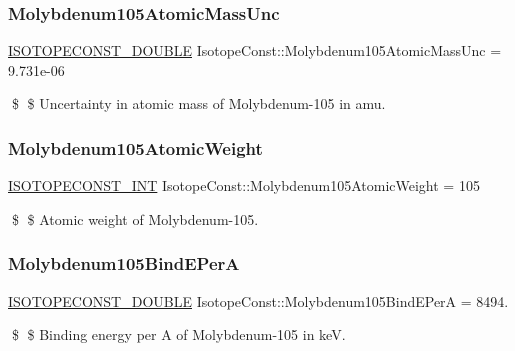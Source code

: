\subsubsection{\texorpdfstring{Molybdenum105\+Atomic\+Mass\+Unc}{Molybdenum105AtomicMassUnc}}
{\footnotesize\ttfamily \mbox{\hyperlink{group___isotope_const-_macros_ga8f45a7272ce02c0b4c65c44636ed719a}{I\+S\+O\+T\+O\+P\+E\+C\+O\+N\+S\+T\+\_\+\+D\+O\+U\+B\+LE}} Isotope\+Const\+::\+Molybdenum105\+Atomic\+Mass\+Unc = 9.\+731e-\/06}

\$ \$ Uncertainty in atomic mass of Molybdenum-\/105 in amu. \mbox{\label{group___isotope_const-_molybdenum-_mo105_gab3e9d7db3d391be26681299f3b67ff0d}} 
\subsubsection{\texorpdfstring{Molybdenum105\+Atomic\+Weight}{Molybdenum105AtomicWeight}}
{\footnotesize\ttfamily \mbox{\hyperlink{group___isotope_const-_macros_ga5f18360b3e99483a35c32d789e62621c}{I\+S\+O\+T\+O\+P\+E\+C\+O\+N\+S\+T\+\_\+\+I\+NT}} Isotope\+Const\+::\+Molybdenum105\+Atomic\+Weight = 105}

\$ \$ Atomic weight of Molybdenum-\/105. \mbox{\label{group___isotope_const-_molybdenum-_mo105_gaf67e3b90991cdcbb587a39f0efc6b17d}} 
\subsubsection{\texorpdfstring{Molybdenum105\+Bind\+E\+PerA}{Molybdenum105BindEPerA}}
{\footnotesize\ttfamily \mbox{\hyperlink{group___isotope_const-_macros_ga8f45a7272ce02c0b4c65c44636ed719a}{I\+S\+O\+T\+O\+P\+E\+C\+O\+N\+S\+T\+\_\+\+D\+O\+U\+B\+LE}} Isotope\+Const\+::\+Molybdenum105\+Bind\+E\+PerA = 8494.}

\$ \$ Binding energy per A of Molybdenum-\/105 in keV. \mbox{\label{group___isotope_const-_molybdenum-_mo105_gac8f748b9881d719cbfd5a2a3fc0d475c}} 

